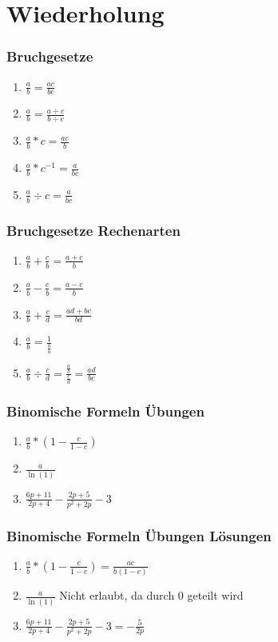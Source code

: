 \section{Wiederholung}
\begin{frame}
    \frametitle{Bruchgesetze}
    \begin{enumerate}
        \vfill \item $\frac{a}{b}=\frac{ac}{bc}$
        \vfill \item $\frac{a}{b}=\frac{a \div c}{b \div c}$
        \vfill \item $\frac{a}{b}*c=\frac{ac}{b}$
        \vfill \item $\frac{a}{b}*c^{-1}=\frac{a}{bc}$
        \vfill \item $\frac{a}{b} \div c=\frac{a}{bc}$
    \end{enumerate}
\end{frame}

\begin{frame}
    \frametitle{Bruchgesetze Rechenarten}
    \begin{enumerate}
        \vfill \item $\frac{a}{b} + \frac{c}{b}=\frac{a+c}{b}$
        \vfill \item $\frac{a}{b} - \frac{c}{b}=\frac{a-c}{b}$
        \vfill \item $\frac{a}{b} + \frac{c}{d}=\frac{ad+bc}{bd}$
        \vfill \item $\frac{a}{b} = \frac{1}{\frac{b}{a}}$
        \vfill \item $\frac{a}{b} \div \frac{c}{d} = \frac{\frac{a}{b}}{\frac{c}{d}} = \frac{ad}{bc}$
    \end{enumerate}
\end{frame}


\begin{frame}
    \frametitle{Binomische Formeln Übungen}
    \begin{enumerate}
        \vfill \item $\frac{a}{b} * (1 - \frac{c}{1-c})$
        \vfill \item $\frac{a}{\ln(1)}$
        \vfill \item $\frac{6p + 11}{2p + 4} - \frac{2p + 5}{p^2 +2p} -3$
    \end{enumerate}
\end{frame}

\begin{frame}
    \frametitle{Binomische Formeln Übungen Lösungen}
    \begin{enumerate}
        \vfill \item $\frac{a}{b} * (1 - \frac{c}{1-c}) = \frac{ac}{b(1-c)}$
        \vfill \item $\frac{a}{\ln(1)}$ Nicht erlaubt, da durch 0 geteilt wird
        \vfill \item $\frac{6p + 11}{2p + 4} - \frac{2p + 5}{p^2 +2p} -3 = -\frac{5}{2p}$
    \end{enumerate}
\end{frame}


